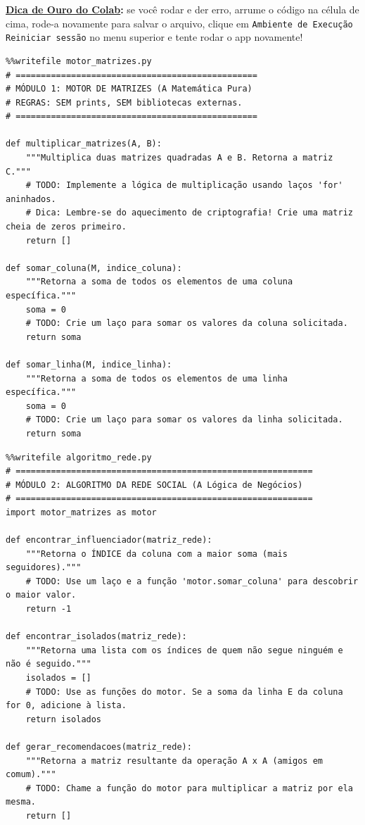 \documentclass[../numerical_methods.tex]{subfiles}
\begin{document}
\textbf{\underline{Dica de Ouro do Colab}:} se você rodar e der erro, arrume o código na célula de cima, rode-a novamente para salvar o arquivo, clique em \texttt{Ambiente de Execução \> Reiniciar sessão} no menu superior e tente rodar o app novamente!

\begin{listing}[H]
	\caption{\textbf{Redes Sociais:} Motor de Matrizes}
	\begin{verbatim}
%%writefile motor_matrizes.py
# ================================================
# MÓDULO 1: MOTOR DE MATRIZES (A Matemática Pura)
# REGRAS: SEM prints, SEM bibliotecas externas.
# ================================================

def multiplicar_matrizes(A, B):
    """Multiplica duas matrizes quadradas A e B. Retorna a matriz C."""
    # TODO: Implemente a lógica de multiplicação usando laços 'for' aninhados.
    # Dica: Lembre-se do aquecimento de criptografia! Crie uma matriz cheia de zeros primeiro.
    return []

def somar_coluna(M, indice_coluna):
    """Retorna a soma de todos os elementos de uma coluna específica."""
    soma = 0
    # TODO: Crie um laço para somar os valores da coluna solicitada.
    return soma

def somar_linha(M, indice_linha):
    """Retorna a soma de todos os elementos de uma linha específica."""
    soma = 0
    # TODO: Crie um laço para somar os valores da linha solicitada.
    return soma
 \end{verbatim}
\end{listing}

\begin{listing}[H]
	\caption{\textbf{Redes Sociais:} Algoritmo da Rede Social}
	\begin{verbatim}
%%writefile algoritmo_rede.py
# ===========================================================
# MÓDULO 2: ALGORITMO DA REDE SOCIAL (A Lógica de Negócios)
# ===========================================================
import motor_matrizes as motor

def encontrar_influenciador(matriz_rede):
    """Retorna o ÍNDICE da coluna com a maior soma (mais seguidores)."""
    # TODO: Use um laço e a função 'motor.somar_coluna' para descobrir o maior valor.
    return -1

def encontrar_isolados(matriz_rede):
    """Retorna uma lista com os índices de quem não segue ninguém e não é seguido."""
    isolados = []
    # TODO: Use as funções do motor. Se a soma da linha E da coluna for 0, adicione à lista.
    return isolados

def gerar_recomendacoes(matriz_rede):
    """Retorna a matriz resultante da operação A x A (amigos em comum)."""
    # TODO: Chame a função do motor para multiplicar a matriz por ela mesma.
    return []
 \end{verbatim}
\end{listing}
\end{document}
